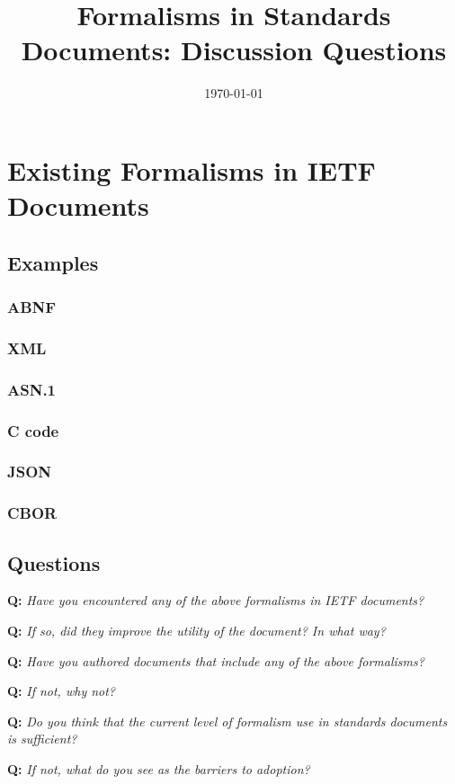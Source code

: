 \documentclass[10pt]{article}
\title{Formalisms in Standards Documents: Discussion Questions}
\date{\today}
\newcommand{\question}[1]{\vspace{4mm}\noindent\textbf{Q:} \textit{#1}}
\begin{document}
\maketitle

\section{Existing Formalisms in IETF Documents}

\subsection{Examples}

\subsubsection*{ABNF}
\subsubsection*{XML}
\subsubsection*{ASN.1}
\subsubsection*{C code}
\subsubsection*{JSON}
\subsubsection*{CBOR}

\subsection{Questions}

\question{Have you encountered any of the above formalisms in IETF documents?}

\question{If so, did they improve the utility of the document? In what way?}

\question{Have you authored documents that include any of the above formalisms?}

\question{If not, why not?}

\question{Do you think that the current level of formalism use in standards documents is sufficient?}

\question{If not, what do you see as the barriers to adoption?}



\end{document}
